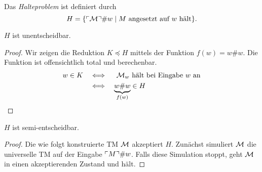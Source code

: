 \begin{Def}[name={[Halteproblem]}]
	Das \emph{Halteproblem} ist definiert durch
	\[H = \{\ulcorner \mathcal{M} \urcorner\# w \mid M \text{ angesetzt auf } w \text{ hält}\}. \qedhere\]
\end{Def}
\begin{Satz}[name={[$H$ ist unentscheidbar]}]\label{satz:H ist unentscheidbar}
	$H$ ist unentscheidbar.
\end{Satz}
\begin{proof}
  Wir zeigen die Reduktion $K \preceq H$ mittels der Funktion $f(w) = w\#w$.
  Die Funktion ist offensichtlich total und berechenbar.
  \begin{align*}
   w \in K & \quad\Longleftrightarrow\quad \text{ $\mathcal{M}_w$ hält bei Eingabe $w$ an}\\
   & \quad\Longleftrightarrow\quad \underbrace{w\#w}_{f(w)} \in H \qedhere
  \end{align*}
\end{proof}
\begin{Satz}[name={[$H$ ist semi-entscheidbar]}]
	$H$ ist semi-entscheidbar.
\end{Satz}
\begin{proof}
  Die wie folgt konstruierte \ac{TM} $\mathcal{M}$ akzeptiert $H$.
  Zunächst simuliert $\mathcal{M}$ die universelle \ac{TM} auf der Eingabe $\ulcorner M \urcorner\#w$.
  Falls diese Simulation stoppt, geht $\mathcal{M}$ in einen akzeptierenden Zustand und hält.
\end{proof}


